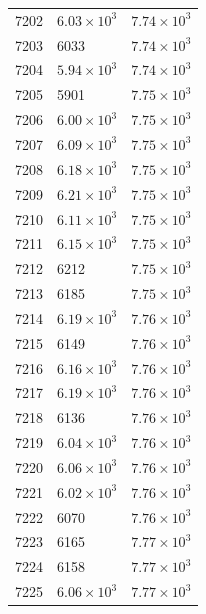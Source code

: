 \begin{table}[H]
\begin{tabular}{lll}
7202 & $\displaystyle 6.03 \times 10^{3}$ & $\displaystyle 7.74 \times 10^{3}$ \\
7203 & 6033 & $\displaystyle 7.74 \times 10^{3}$ \\
7204 & $\displaystyle 5.94 \times 10^{3}$ & $\displaystyle 7.74 \times 10^{3}$ \\
7205 & 5901 & $\displaystyle 7.75 \times 10^{3}$ \\
7206 & $\displaystyle 6.00 \times 10^{3}$ & $\displaystyle 7.75 \times 10^{3}$ \\
7207 & $\displaystyle 6.09 \times 10^{3}$ & $\displaystyle 7.75 \times 10^{3}$ \\
7208 & $\displaystyle 6.18 \times 10^{3}$ & $\displaystyle 7.75 \times 10^{3}$ \\
7209 & $\displaystyle 6.21 \times 10^{3}$ & $\displaystyle 7.75 \times 10^{3}$ \\
7210 & $\displaystyle 6.11 \times 10^{3}$ & $\displaystyle 7.75 \times 10^{3}$ \\
7211 & $\displaystyle 6.15 \times 10^{3}$ & $\displaystyle 7.75 \times 10^{3}$ \\
7212 & 6212 & $\displaystyle 7.75 \times 10^{3}$ \\
7213 & 6185 & $\displaystyle 7.75 \times 10^{3}$ \\
7214 & $\displaystyle 6.19 \times 10^{3}$ & $\displaystyle 7.76 \times 10^{3}$ \\
7215 & 6149 & $\displaystyle 7.76 \times 10^{3}$ \\
7216 & $\displaystyle 6.16 \times 10^{3}$ & $\displaystyle 7.76 \times 10^{3}$ \\
7217 & $\displaystyle 6.19 \times 10^{3}$ & $\displaystyle 7.76 \times 10^{3}$ \\
7218 & 6136 & $\displaystyle 7.76 \times 10^{3}$ \\
7219 & $\displaystyle 6.04 \times 10^{3}$ & $\displaystyle 7.76 \times 10^{3}$ \\
7220 & $\displaystyle 6.06 \times 10^{3}$ & $\displaystyle 7.76 \times 10^{3}$ \\
7221 & $\displaystyle 6.02 \times 10^{3}$ & $\displaystyle 7.76 \times 10^{3}$ \\
7222 & 6070 & $\displaystyle 7.76 \times 10^{3}$ \\
7223 & 6165 & $\displaystyle 7.77 \times 10^{3}$ \\
7224 & 6158 & $\displaystyle 7.77 \times 10^{3}$ \\
7225 & $\displaystyle 6.06 \times 10^{3}$ & $\displaystyle 7.77 \times 10^{3}$ \\

\end{tabular}
\end{table}
